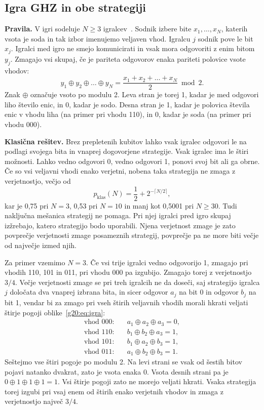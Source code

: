 \subsection{Igra GHZ in obe strategiji}
\label{g20:sec:igra}

\textbf{Pravila.} V igri sodeluje $N\ge3$ igralcev~\cite{g20:brassard2005}. Sodnik izbere bite $x_1,\dots,x_N$, katerih vsota je soda in tak izbor imenujemo veljaven vhod. Igralcu $j$ sodnik pove le bit $x_j$. Igralci med igro ne smejo komunicirati in vsak mora odgovoriti z enim bitom $y_j$. Zmagajo vsi skupaj, če je pariteta odgovorov enaka pariteti polovice vsote vhodov:
\begin{equation}
y_1\oplus y_2\oplus\dots\oplus y_N = \frac{x_1+x_2+\dots+x_N}{2} \bmod 2 .
\label{g20:eq:igra}
\end{equation}
Znak $\oplus$ označuje vsoto po modulu 2. Leva stran je torej 1, kadar je med odgovori liho število enic, in 0, kadar je sodo. Desna stran je 1, kadar je polovica števila enic v vhodu liha (na primer pri vhodu 110), in 0, kadar je soda (na primer pri vhodu 000).

\textbf{Klasična rešitev.} Brez prepletenih kubitov lahko vsak igralec odgovori le na podlagi svojega bita in vnaprej dogovorjene strategije. Vsak igralec ima le štiri možnosti. Lahko vedno odgovori 0, vedno odgovori 1, ponovi svoj bit ali ga obrne. Če so vsi veljavni vhodi enako verjetni, nobena taka strategija ne zmaga z verjetnostjo, večjo od~\cite{g20:brassard2005}
\begin{equation}
p_\text{klas}(N) = \frac{1}{2} + 2^{-\lceil N/2\rceil},
\label{g20:eq:meja}
\end{equation}
kar je 0,75 pri $N=3$, 0,53 pri $N=10$ in manj kot 0,5001 pri $N\ge 30$. Tudi naključna mešanica strategij ne pomaga. Pri njej igralci pred igro skupaj izžrebajo, katero strategijo bodo uporabili. Njena verjetnost zmage je zato povprečje verjetnosti zmage posameznih strategij, povprečje pa ne more biti večje od največje izmed njih.

Za primer vzemimo $N=3$. Če vsi trije igralci vedno odgovorijo 1, zmagajo pri vhodih 110, 101 in 011, pri vhodu 000 pa izgubijo. Zmagajo torej z verjetnostjo $3/4$. Večje verjetnosti zmage se pri treh igralcih ne da doseči, saj strategijo igralca $j$ določata dva vnaprej izbrana bita, in sicer odgovor $a_j$ na bit 0 in odgovor $b_j$ na bit 1, vendar bi za zmago pri vseh štirih veljavnih vhodih morali hkrati veljati štirje pogoji oblike~\eqref{g20:eq:igra}:
\[
\begin{aligned}
\text{vhod 000:}\quad & a_1\oplus a_2\oplus a_3 = 0,\\
\text{vhod 110:}\quad & b_1\oplus b_2\oplus a_3 = 1,\\
\text{vhod 101:}\quad & b_1\oplus a_2\oplus b_3 = 1,\\
\text{vhod 011:}\quad & a_1\oplus b_2\oplus b_3 = 1.
\end{aligned}
\]
Seštejmo vse štiri pogoje po modulu 2. Na levi strani se vsak od šestih bitov pojavi natanko dvakrat, zato je vsota enaka 0. Vsota desnih strani pa je $0\oplus1\oplus1\oplus1=1$. Vsi štirje pogoji zato ne morejo veljati hkrati. Vsaka strategija torej izgubi pri vsaj enem od štirih enako verjetnih vhodov in zmaga z verjetnostjo največ $3/4$.

